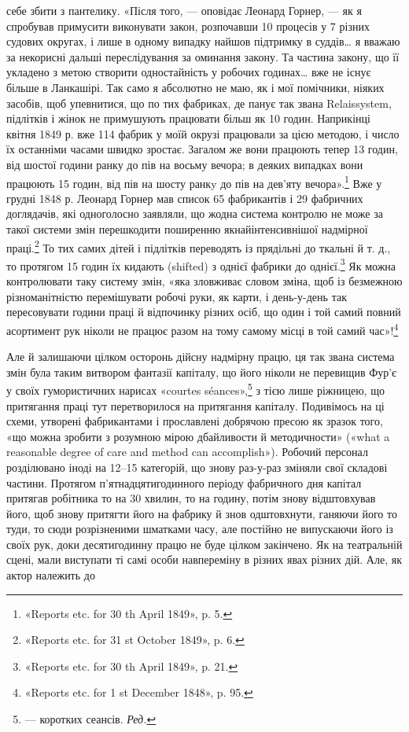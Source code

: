 \parcont{}  %
себе збити з пантелику. «Після того, — оповідає Леонард Горнер, —
як я спробував примусити виконувати закон, розпочавши 10 процесів
у 7 різних судових округах, і лише в одному випадку найшов
підтримку в суддів\dots{} я вважаю за некорисні дальші переслідування
за оминання закону. Та частина закону, що її укладено
з метою створити одностайність у робочих годинах\dots{} вже не існує
більше в Ланкашірі. Так само я абсолютно не маю, як і мої помічники,
ніяких засобів, щоб упевнитися, що по тих фабриках, де
панує так звана Relaissystem, підлітків і жінок не примушують
працювати більш як 10 годин. Наприкінці квітня 1849 р. вже
114 фабрик у моїй окрузі працювали за цією методою, і число
їх останніми часами швидко зростає. Загалом же вони працюють
тепер 13 годин, від шостої години ранку до пів на восьму вечора;
в деяких випадках вони працюють 15 годин, від пів на шосту
ранкy до пів на дев’яту вечора».\footnote{
«Reports etc. for 30 th April 1849», p. 5.
} Вже у грудні 1848 р. Леонард
Горнер мав список 65 фабрикантів і 29 фабричних доглядачів,
які одноголосно заявляли, що жодна система контролю не може
за такої системи змін перешкодити поширенню якнайінтенсивнішої
надмірної праці.\footnote{
«Reports etc. for 31 st October 1849», p. 6.
} То тих самих дітей і підлітків переводять
із прядільні до ткальні й т. д., то протягом 15 годин їх
кидають (shifted) з однієї фабрики до однієї.\footnote{
«Reports etc. for 30 th April 1849», p. 21.
} Як можна контролювати
таку систему змін, «яка зловживає словом зміна, щоб із
безмежною різноманітністю перемішувати робочі руки, як карти,
і день-у-день так пересовувати години праці й відпочинку
різних осіб, що один і той самий повний асортимент рук ніколи
не працює разом на тому самому місці в той самий час»!\footnote{
«Reports etc. for 1 st December 1848», p. 95.
}

Але й залишаючи цілком осторонь дійсну надмірну працю,
ця так звана система змін була таким витвором фантазії капіталу,
що його ніколи не перевищив Фур’є у своїх гумористичних
нарисах «courtes séances»,\footnote*{
— коротких сеансів. \emph{Ред.}
} з тією лише ріжницею, що притягання
праці тут перетворилося на притягання капіталу. Подивімось
на ці схеми, утворені фабрикантами і прославлені добрячою
пресою як зразок того, «що можна зробити з розумною мірою
дбайливости й методичности» («what a reasonable degree of care
and method can accomplish»). Робочий персонал розділювано
іноді на 12--15 категорій, що знову раз-у-раз зміняли свої
складові частини. Протягом п’ятнадцятигодинного періоду фабричного
дня капітал притягав робітника то на 30 хвилин, то на
годину, потім знову відштовхував його, щоб знову притягти
його на фабрику й знов одштовхнути, ганяючи його то туди, то сюди
розрізненими шматками часу, але постійно не випускаючи його
із своїх рук, доки десятигодинну працю не буде цілком закінчено.
Як на театральній сцені, мали виступати ті самі особи навпереміну
в різних явах різних дій. Але, як актор належить до
\parbreak{}  %

